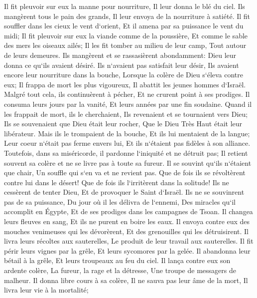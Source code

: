 \verse Il fit pleuvoir sur eux la manne pour nourriture, Il leur donna le blé du ciel. 
\verse Ils mangèrent tous le pain des grands, Il leur envoya de la nourriture à satiété. 
\verse Il fit souffler dans les cieux le vent d`orient, Et il amena par sa puissance le vent du midi; 
\verse Il fit pleuvoir sur eux la viande comme de la poussière, Et comme le sable des mers les oiseaux ailés; 
\verse Il les fit tomber au milieu de leur camp, Tout autour de leurs demeures. 
\verse Ils mangèrent et se rassasièrent abondamment: Dieu leur donna ce qu`ils avaient désiré. 
\verse Ils n`avaient pas satisfait leur désir, Ils avaient encore leur nourriture dans la bouche, 
\verse Lorsque la colère de Dieu s`éleva contre eux; Il frappa de mort les plus vigoureux, Il abattit les jeunes hommes d`Israël. 
\verse Malgré tout cela, ils continuèrent à pécher, Et ne crurent point à ses prodiges. 
\verse Il consuma leurs jours par la vanité, Et leurs années par une fin soudaine. 
\verse Quand il les frappait de mort, ils le cherchaient, Ils revenaient et se tournaient vers Dieu; 
\verse Ils se souvenaient que Dieu était leur rocher, Que le Dieu Très Haut était leur libérateur. 
\verse Mais ils le trompaient de la bouche, Et ils lui mentaient de la langue; 
\verse Leur coeur n`était pas ferme envers lui, Et ils n`étaient pas fidèles à son alliance. 
\verse Toutefois, dans sa miséricorde, il pardonne l`iniquité et ne détruit pas; Il retient souvent sa colère et ne se livre pas à toute sa fureur. 
\verse Il se souvint qu`ils n`étaient que chair, Un souffle qui s`en va et ne revient pas. 
\verse Que de fois ils se révoltèrent contre lui dans le désert! Que de fois ils l`irritèrent dans la solitude! 
\verse Ils ne cessèrent de tenter Dieu, Et de provoquer le Saint d`Israël. 
\verse Ils ne se souvinrent pas de sa puissance, Du jour où il les délivra de l`ennemi, 
\verse Des miracles qu`il accomplit en Égypte, Et de ses prodiges dans les campagnes de Tsoan. 
\verse Il changea leurs fleuves en sang, Et ils ne purent en boire les eaux. 
\verse Il envoya contre eux des mouches venimeuses qui les dévorèrent, Et des grenouilles qui les détruisirent. 
\verse Il livra leurs récoltes aux sauterelles, Le produit de leur travail aux sauterelles. 
\verse Il fit périr leurs vignes par la grêle, Et leurs sycomores par la gelée. 
\verse Il abandonna leur bétail à la grêle, Et leurs troupeaux au feu du ciel. 
\verse Il lança contre eux son ardente colère, La fureur, la rage et la détresse, Une troupe de messagers de malheur. 
\verse Il donna libre cours à sa colère, Il ne sauva pas leur âme de la mort, Il livra leur vie à la mortalité; 
